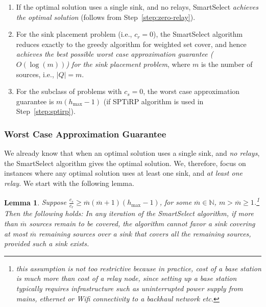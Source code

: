 \documentclass[conference]{IEEEtran}
\newcommand{\mbar}{\overline{m}}
\newtheorem{lemma}{Lemma}
\begin{document}
\begin{enumerate}
\item If the optimal solution uses a single sink, and no relays, SmartSelect \emph{achieves the optimal solution} (follows from Step~\ref{step:zero-relay}).
\item For the sink placement problem (i.e., $c_r=0$), the SmartSelect algorithm reduces exactly to the greedy algorithm for weighted set cover, and hence \emph{achieves the best possible worst case approximation guarantee ($O(\log(m))$) for the sink placement problem}, where $m$ is the number of sources, i.e., $|Q|=m$.
\item For the subclass of problems with $c_s = 0$, the worst case approximation guarantee is $m(h_{\max}-1)$ (if SPTiRP algorithm is used in Step~\ref{step:sptirp}).
\end{enumerate}

\subsubsection{Worst Case Approximation Guarantee}
We already know that when an optimal solution uses a single sink, and \emph{no relays}, the SmartSelect algorithm gives the optimal solution. We, therefore, focus on instances where any optimal solution uses at least one sink, and \emph{at least one relay}. We start with the following lemma.

\begin{lemma}
\label{lem:greedy-lemma}
Suppose $\frac{c_s}{c_r}\geq \mbar(\mbar+1)(h_{\max}-1)$, for some $\mbar\in\mathbb{N}$, $m > \mbar \geq 1$.\footnote{this assumption is not too restrictive because in practice, cost of a base station is much more than cost of a relay node, since setting up a base station typically requires infrastructure such as uninterrupted power supply from mains, ethernet or Wifi connectivity to a backhaul network etc.} Then the following holds: In any iteration of the SmartSelect algorithm, if more than $\mbar$ sources remain to be covered, the algorithm cannot favor a sink covering at most $\mbar$ remaining sources over a sink that covers \emph{all} the remaining sources, provided such a sink exists.
\end{lemma}
\end{document}
